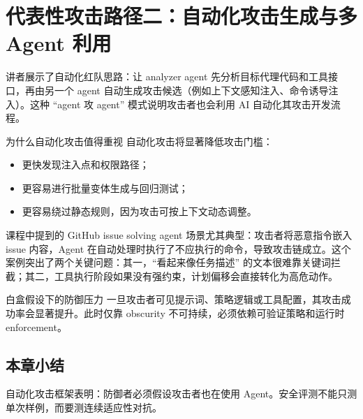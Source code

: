\section{代表性攻击路径二：自动化攻击生成与多 Agent 利用}

讲者展示了自动化红队思路：让 analyzer agent 先分析目标代理代码和工具接口，再由另一个 agent 自动生成攻击候选（例如上下文感知注入、命令诱导注入）。这种 ``agent 攻 agent'' 模式说明攻击者也会利用 AI 自动化其攻击开发流程。

\begin{knowledgebox}{为什么自动化攻击值得重视}
自动化攻击将显著降低攻击门槛：
\begin{itemize}
    \item 更快发现注入点和权限路径；
    \item 更容易进行批量变体生成与回归测试；
    \item 更容易绕过静态规则，因为攻击可按上下文动态调整。
\end{itemize}
\end{knowledgebox}

课程中提到的 GitHub issue solving agent 场景尤其典型：攻击者将恶意指令嵌入 issue 内容，Agent 在自动处理时执行了不应执行的命令，导致攻击链成立。这个案例突出了两个关键问题：其一，``看起来像任务描述'' 的文本很难靠关键词拦截；其二，工具执行阶段如果没有强约束，计划偏移会直接转化为高危动作。

\begin{warningbox}{白盒假设下的防御压力}
一旦攻击者可见提示词、策略逻辑或工具配置，其攻击成功率会显著提升。此时仅靠 obscurity 不可持续，必须依赖可验证策略和运行时 enforcement。
\end{warningbox}

\subsection{本章小结}
自动化攻击框架表明：防御者必须假设攻击者也在使用 Agent。安全评测不能只测单次样例，而要测连续适应性对抗。

